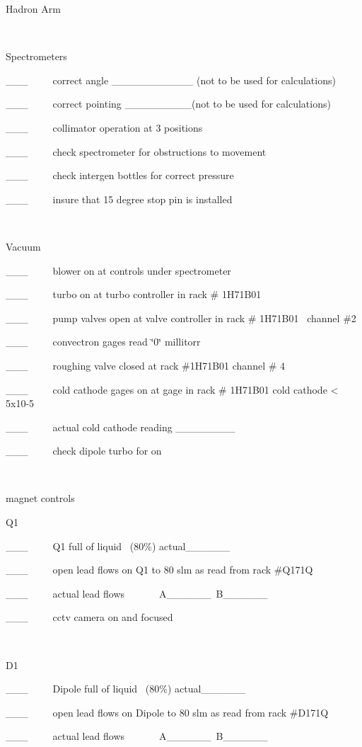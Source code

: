 Hadron Arm

~

Spectrometers

\_\_\_~~~~~correct angle \_\_\_\_\_\_\_\_\_\_\_ (not to be used for calculations)

\_\_\_~~~~~correct pointing \_\_\_\_\_\_\_\_\_(not to be used for calculations)

\_\_\_~~~~~collimator operation at 3 positions

\_\_\_~~~~~check spectrometer for obstructions to movement

\_\_\_~~~~~check intergen bottles for correct pressure

\_\_\_~~~~~insure that 15 degree stop pin is installed

~

Vacuum 

\_\_\_~~~~~blower on at controls under spectrometer

\_\_\_~~~~~turbo on at turbo controller in rack \# 1H71B01

\_\_\_~~~~~pump valves open at valve controller in rack \# 1H71B01~ channel
\#2 

\_\_\_~~~~~convectron gages read \char`\"{}0\char`\"{} millitorr 

\_\_\_~~~~~roughing valve closed at rack \#1H71B01 channel \# 4 

\_\_\_~~~~~cold cathode gages on at gage in rack \# 1H71B01 cold cathode < 5x10-5

\_\_\_~~~~~actual cold cathode reading \_\_\_\_\_\_\_\_

\_\_\_~~~~~check dipole turbo for on

~

magnet controls

Q1

\_\_\_~~~~~Q1 full of liquid~ (80\%) actual\_\_\_\_\_\_

\_\_\_~~~~~open lead flows on Q1 to 80 slm as read from rack \#Q171Q

\_\_\_~~~~~actual lead flows~~~~~~~A\_\_\_\_\_\_~B\_\_\_\_\_\_

\_\_\_~~~~~cctv camera on and focused

~

D1

\_\_\_~~~~~Dipole full of liquid~ (80\%) actual\_\_\_\_\_\_

\_\_\_~~~~~open lead flows on Dipole to 80 slm as read from rack \#D171Q

\_\_\_~~~~~actual lead flows~~~~~~~A\_\_\_\_\_\_~B\_\_\_\_\_\_

